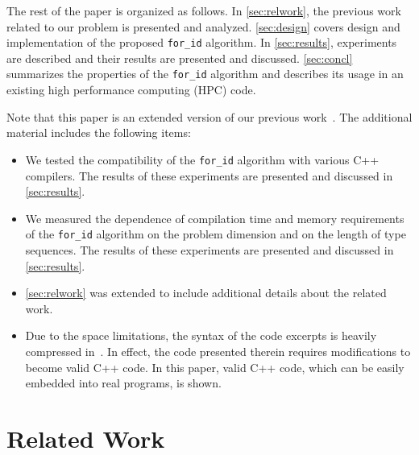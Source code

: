 \documentclass[10pt,a4paper]{article}
\theoremstyle{definition}\newtheorem{problem}{Problem}
\providecommand{\forid}{\texttt{for\_id}\xspace}
\begin{document}
The rest of the paper is organized as follows. In \autoref{sec:relwork}, the previous work related to our problem is presented and analyzed. \autoref{sec:design} covers design and implementation of the proposed \forid algorithm. In \autoref{sec:results}, experiments are described and their results are presented and discussed. \autoref{sec:concl} summarizes the properties of the \forid algorithm and describes its usage in an existing high performance computing (HPC) code.

Note that this paper is an extended version of our previous work~\cite{RefWorks:107}. The additional material includes the following items:
\begin{itemize}

\item We tested the compatibility of the \forid algorithm with various C++ compilers. The results of these experiments are presented and discussed in \autoref{sec:results}.

\item We measured the dependence of compilation time and memory requirements of the \forid algorithm on the problem dimension and on the length of type sequences. The results of these experiments are presented and discussed in \autoref{sec:results}.

\item \autoref{sec:relwork} was extended to include additional details about the related work. 
\item Due to the space limitations, the syntax of the code excerpts is heavily compressed in~\cite{RefWorks:107}. In effect, the code presented therein requires modifications to become valid C++ code. In this paper, valid C++ code, which can be easily embedded into real programs, is shown.



\end{itemize}

\section{Related Work}
\label{sec:relwork}
\end{document}
